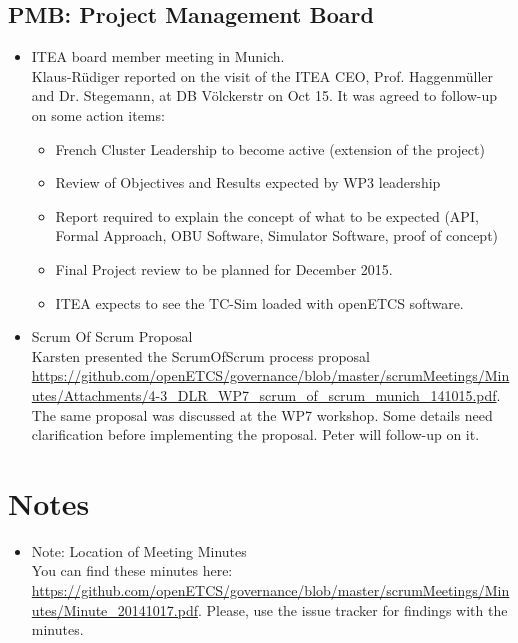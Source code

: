 \documentclass[a4paper, 11pt]{article}
\begin{document}
\subsection{PMB: Project Management Board}
\begin{itemize}

\item ITEA board member meeting in Munich.\\
 Klaus-R\"udiger reported on the visit of the ITEA CEO, Prof. Haggenm\"uller and Dr. Stegemann,  at DB V\"olckerstr on Oct 15. It was agreed to  follow-up on some action items:\\
\begin{itemize}
\item French Cluster Leadership to become active (extension of the project)
\item Review of Objectives and Results expected by WP3 leadership
\item Report required to explain the concept of what to be expected (API, Formal Approach, OBU Software, Simulator Software, proof of concept)
\item Final Project  review to be planned for December 2015.
\item ITEA expects to see the TC-Sim loaded with openETCS software.
\end{itemize}

\item Scrum Of Scrum Proposal\\
Karsten presented the ScrumOfScrum process proposal \url{https://github.com/openETCS/governance/blob/master/scrumMeetings/Minutes/Attachments/4-3_DLR_WP7_scrum_of_scrum_munich_141015.pdf}. The same proposal was discussed at the WP7 workshop. Some details need clarification before implementing the proposal. Peter will follow-up on it.

\end{itemize}

\section{Notes}
\begin{itemize}

\item Note: Location of Meeting Minutes\\
You can find these minutes here: \url{https://github.com/openETCS/governance/blob/master/scrumMeetings/Minutes/Minute_20141017.pdf}. Please, use the issue tracker for findings with the minutes.

\end{itemize}
\end{document}

